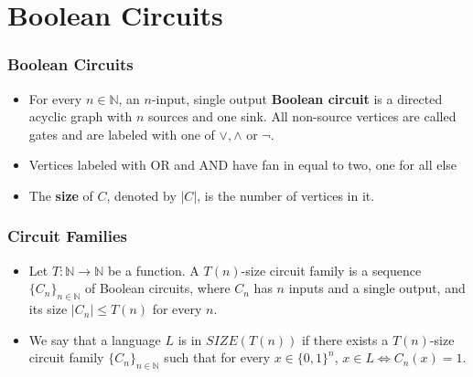\documentclass{beamer}
\begin{document}
\section{Boolean Circuits}

\begin{frame}

\frametitle{Boolean Circuits}

\begin{itemize}
\item For every $n \in \mathbb{N}$, an $n$-input, single output \textbf{Boolean circuit} is a directed acyclic graph with $n$ sources and one sink. All non-source vertices are called gates and are labeled with one of $\lor, \land$ or $\neg$.
\item Vertices labeled with OR and AND have fan in equal to two, one for all else
\item The \textbf{size} of $C$, denoted by $|C|$, is the number of vertices in it.
\end{itemize}

\end{frame}

\begin{frame}

\frametitle{Circuit Families}

\begin{itemize}
\item Let $T: \mathbb{N} \to \mathbb{N}$ be a function. A $T(n)$-size circuit family is a sequence $\{C_n\}_{n \in \mathbb{N}}$ of Boolean circuits, where $C_n$ has $n$ inputs and a single output, and its size $|C_n| \leq T(n)$ for every $n$.
\item We say that a language $L$ is in $SIZE(T(n))$ if there exists a $T(n)$-size circuit family $\{C_n\}_{n \in \mathbb{N}}$ such that for every $x \in \{0,1\}^n$, $x \in L \iff C_n(x) = 1$.
\end{itemize}

\end{frame}
\end{document}
